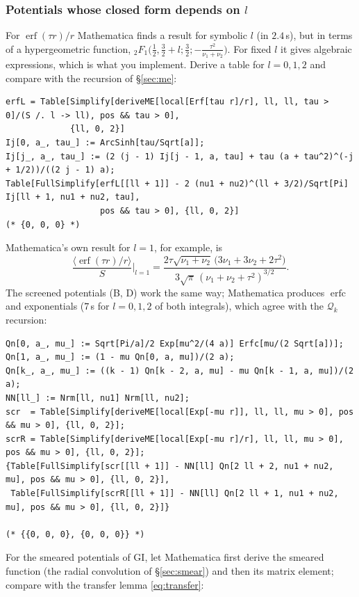 \documentclass[11pt,a4paper]{article}
\numberwithin{equation}{section}
\theoremstyle{definition}
\theoremstyle{plain}
\theoremstyle{remark}
\numberwithin{algorithm}{section}
\newcommand{\erf}{\operatorname{erf}}
\newcommand{\erfc}{\operatorname{erfc}}
\begin{document}
\subsubsection{Potentials whose closed form depends on \texorpdfstring{$l$}{l}}
For $\erf(\tau r)/r$ Mathematica finds a result for symbolic $l$ (in $2.4\,$s), but in terms of a hypergeometric function, ${}_2F_1\big(\frac12,\frac32+l;\frac32;-\frac{\tau^2}{\nu_1+\nu_2}\big)$. For fixed $l$ it gives algebraic expressions, which is what you implement. Derive a table for $l=0,1,2$ and compare with the recursion of \S\ref{sec:me}:
\begin{lstlisting}[style=wl]
erfL = Table[Simplify[deriveME[local[Erf[tau r]/r], ll, ll, tau > 0]/(S /. l -> ll), pos && tau > 0],
             {ll, 0, 2}]
Ij[0, a_, tau_] := ArcSinh[tau/Sqrt[a]];
Ij[j_, a_, tau_] := (2 (j - 1) Ij[j - 1, a, tau] + tau (a + tau^2)^(-j + 1/2))/((2 j - 1) a);
Table[FullSimplify[erfL[[ll + 1]] - 2 (nu1 + nu2)^(ll + 3/2)/Sqrt[Pi] Ij[ll + 1, nu1 + nu2, tau],
                   pos && tau > 0], {ll, 0, 2}]                                                          (* {0, 0, 0} *)
\end{lstlisting}
Mathematica's own result for $l=1$, for example, is
\[
\frac{\langle\erf(\tau r)/r\rangle}{S}\bigg|_{l=1}=\frac{2\tau\sqrt{\nu_1+\nu_2}\,\big(3\nu_1+3\nu_2+2\tau^2\big)}{3\sqrt\pi\,(\nu_1+\nu_2+\tau^2)^{3/2}} .
\]
The screened potentials (B, D) work the same way; Mathematica produces $\erfc$ and exponentials ($7\,$s for $l=0,1,2$ of both integrals), which agree with the $\mathcal Q_k$ recursion:
\begin{lstlisting}[style=wl]
Qn[0, a_, mu_] := Sqrt[Pi/a]/2 Exp[mu^2/(4 a)] Erfc[mu/(2 Sqrt[a])];
Qn[1, a_, mu_] := (1 - mu Qn[0, a, mu])/(2 a);
Qn[k_, a_, mu_] := ((k - 1) Qn[k - 2, a, mu] - mu Qn[k - 1, a, mu])/(2 a);
NN[ll_] := Nrm[ll, nu1] Nrm[ll, nu2];
scr  = Table[Simplify[deriveME[local[Exp[-mu r]], ll, ll, mu > 0], pos && mu > 0], {ll, 0, 2}];
scrR = Table[Simplify[deriveME[local[Exp[-mu r]/r], ll, ll, mu > 0], pos && mu > 0], {ll, 0, 2}];
{Table[FullSimplify[scr[[ll + 1]] - NN[ll] Qn[2 ll + 2, nu1 + nu2, mu], pos && mu > 0], {ll, 0, 2}],
 Table[FullSimplify[scrR[[ll + 1]] - NN[ll] Qn[2 ll + 1, nu1 + nu2, mu], pos && mu > 0], {ll, 0, 2}]}
                                                                           (* {{0, 0, 0}, {0, 0, 0}} *)
\end{lstlisting}
For the smeared potentials of GI, let Mathematica first derive the smeared function (the radial convolution of \S\ref{sec:smear}) and then its matrix element; compare with the transfer lemma \eqref{eq:transfer}:
\end{document}
